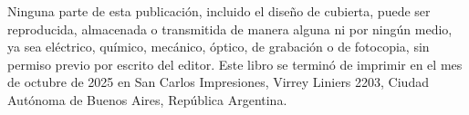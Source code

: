 \vfill

\noindent {}\bigskip

\noindent Ninguna parte de esta publicación, incluido el diseño de cubierta, puede ser reproducida, almacenada o transmitida de manera alguna ni por ningún medio, ya sea eléctrico, químico, mecánico, óptico, de grabación o de fotocopia, sin permiso previo por escrito del editor. Este libro se terminó de imprimir en el mes de octubre de 2025 en San Carlos Impresiones, Virrey Liniers 2203, Ciudad Autónoma de Buenos Aires, República Argentina.
